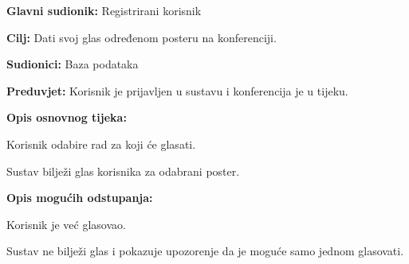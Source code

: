 					\noindent {}
					\begin{packed_item}
						
						\item \textbf{Glavni sudionik: }Registrirani korisnik
						\item  \textbf{Cilj:} Dati svoj glas određenom posteru na konferenciji.
						\item  \textbf{Sudionici:} Baza podataka
						\item  \textbf{Preduvjet:} Korisnik je prijavljen u sustavu i konferencija je u tijeku.
						\item  \textbf{Opis osnovnog tijeka:}
						
						\item[] \begin{packed_enum}
							
							\item Korisnik odabire rad za koji će glasati.
							\item Sustav bilježi glas korisnika za odabrani poster.
							
						\end{packed_enum}
						
						\item  \textbf{Opis mogućih odstupanja:}
						
						\item[] \begin{packed_item}
							
							\item[2.a] Korisnik je već glasovao.
							\item[] \begin{packed_enum}
								
								\item Sustav ne bilježi glas i pokazuje upozorenje da je moguće samo jednom glasovati.
								
							\end{packed_enum}
							
						\end{packed_item}
					\end{packed_item}

